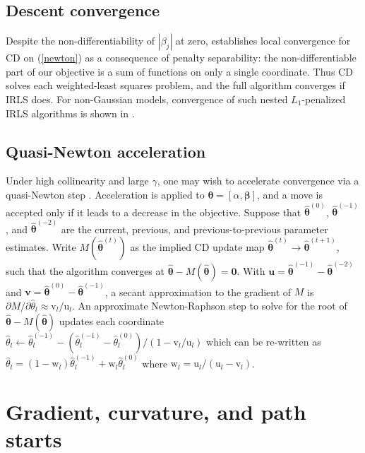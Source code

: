 \documentclass[12pt]{article}
\newcommand{\bs}[1]{\boldsymbol{#1}}
\newcommand{\mr}[1]{\mathrm{#1}}
\newcommand{\bm}[1]{\mathbf{#1}}
\begin{document}
\subsection{Descent convergence}

 Despite the non-differentiability of $|\beta_j|$ at zero,
\citet{tseng_convergence_2001} establishes local convergence for CD on
(\ref{newton}) as a consequence of penalty separability: the
non-differentiable part of our objective is a sum of functions on only a
single coordinate.  Thus CD solves each weighted-least squares problem, and
the full algorithm converges if IRLS does.  For non-Gaussian models,
convergence of such nested $L_1$-penalized IRLS algorithms is shown
in \cite{lee_proximal_2014}.

\subsection{Quasi-Newton acceleration}
\label{qn}

Under high collinearity and large $\gamma$, one may wish to accelerate convergence via a quasi-Newton step
\citep[e.g.,][]{lange_numerical_2010}. Acceleration is applied to $\bs{\theta}
= [\alpha,\bs{\beta}]$, and a move is accepted only if it leads to a decrease
in the objective. Suppose that $\bs{\hat\theta}^{(0)}$,
$\bs{\hat\theta}^{(-1)}$, and $\bs{\hat\theta}^{(-2)}$ are the current,
previous, and previous-to-previous parameter estimates.  Write
$M(\bs{\hat\theta}^{(t)})$ as the implied CD update map $\bs{\hat\theta}^{(t)}
\rightarrow \bs{\hat\theta}^{(t+1)}$, such that the algorithm converges at
$\bs{\hat\theta} - M(\bs{\hat\theta}) = \bm{0}$.  With $\bm{u} =
\bs{\hat\theta}^{(-1)} - \bs{\hat\theta}^{(-2)}$ and $\bm{v} =
\bs{\hat\theta}^{(0)} - \bs{\hat\theta}^{(-1)}$, a secant approximation to the
gradient of $M$ is $\partial M/\partial \hat\theta_l \approx
\mr{v}_l/\mr{u}_l$.  An approximate Newton-Raphson step to solve for the root
of $\bs{\hat\theta} - M(\bs{\hat\theta}) $  updates each coordinate $\hat
\theta_l \gets \hat\theta_l^{(-1)} - (\hat\theta_l^{(-1)} -
\hat\theta_l^{(0)})/(1-\mr{v}_l/\mr{u}_l)$ which can be re-written as
$\hat\theta_l = (1-\mr{w}_l)\hat\theta_l^{(-1)} + \mr{w}_l\hat\theta_l^{(0)} $
where $\mr{w}_l = \mr{u}_l/(\mr{u}_l - \mr{v}_l)$.



\section{Gradient, curvature, and path starts}
\label{models}
\end{document}
